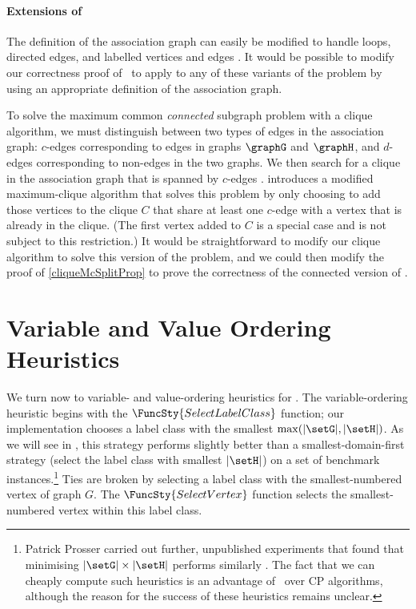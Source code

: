 \paragraph{Extensions of \McSplit}
The definition of the association graph can easily be modified to handle loops,
directed edges, and labelled vertices and edges \citep{LeviG}.  It would be
possible to modify our correctness proof of \McSplit\ to apply to any of these
variants of the problem by using an appropriate definition of the association
graph.

To solve the maximum common \emph{connected} subgraph problem with a clique algorithm,
we must distinguish between two types of edges in the association graph: $c$-edges
corresponding to edges in graphs $\graphG$ and $\graphH$, and $d$-edges corresponding
to non-edges in the two graphs.  We then search for a clique in the association graph
that is spanned by $c$-edges
\citep{DBLP:journals/tcs/Koch01,DBLP:conf/mco/VismaraV08,DBLP:conf/cp/McCreeshNPS16}.
\citet{DBLP:conf/cp/McCreeshNPS16} introduces a modified maximum-clique algorithm
that solves this problem by only choosing to add those vertices to the clique $C$ that
share at least one $c$-edge with a vertex that is already in the clique.  (The first
vertex added to $C$ is a special case and is not subject to this restriction.)
It would be straightforward to modify our clique algorithm to solve this version of the
problem, and we could then modify the proof of \cref{cliqueMcSplitProp} to prove the
correctness of the connected version of \McSplit.

\section{Variable and Value Ordering Heuristics}\label{sec:mcsplit-heuristics}

We turn now to variable- and value-ordering heuristics for \McSplit.
The variable-ordering heuristic begins with the $\FuncSty{SelectLabelClass}$
function; our implementation chooses a label class with the smallest
$\max(|\setG|,|\setH|)$. As we will see in 
, this strategy performs slightly
better than a smallest-domain-first strategy (select the label class
with smallest $|\setH|$) on a set of benchmark instances.\footnote{Patrick
Prosser carried out further, unpublished experiments
that found that minimising $|\setG|\times|\setH|$ performs similarly
\citep{Prosser2017McSplitHeuristics}. The fact that we can cheaply compute
such heuristics is an advantage of \McSplit\ over CP algorithms, although
the reason for the success of these heuristics remains unclear.}
Ties are broken by selecting a label class with the smallest-numbered
vertex of graph $G$.
The $\FuncSty{SelectVertex}$ function selects the smallest-numbered vertex
within this label class.

